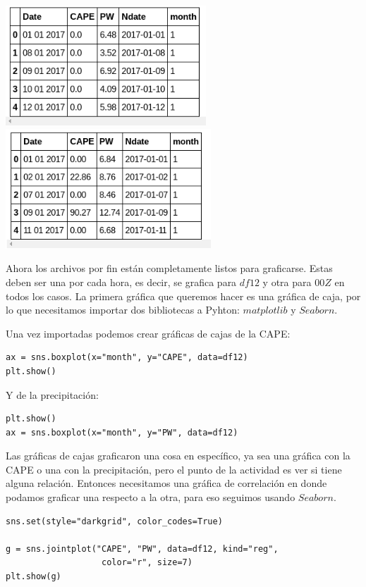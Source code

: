 \documentclass{article}
\begin{document}
    \begin{center}
    \includegraphics[height=4.5cm]{datos00.png}
    \includegraphics[height=4.5cm]{datos12.png}
    \end{center}
    
Ahora los archivos por fin están completamente listos para graficarse. Estas deben ser una por cada hora, es decir, se grafica para $df12$ y otra para $00Z$ en todos los casos. La primera gráfica que queremos hacer es una gráfica de caja, por lo que necesitamos importar dos bibliotecas a Pyhton: $matplotlib$ y $Seaborn$. 

Una vez importadas podemos crear gráficas de cajas de la CAPE:

\begin{verbatim}
ax = sns.boxplot(x="month", y="CAPE", data=df12)
plt.show()
\end{verbatim}

Y de la precipitación:

\begin{verbatim}
plt.show()
ax = sns.boxplot(x="month", y="PW", data=df12)
\end{verbatim}

Las gráficas de cajas graficaron una cosa en específico, ya sea una gráfica con la CAPE o una con la precipitación, pero el punto de la actividad es ver si tiene alguna relación. Entonces necesitamos una gráfica de correlación en donde podamos graficar una respecto a la otra, para eso seguimos usando $Seaborn$. 

\begin{verbatim}
sns.set(style="darkgrid", color_codes=True)

g = sns.jointplot("CAPE", "PW", data=df12, kind="reg",
                   color="r", size=7)
plt.show(g)
\end{verbatim}
\end{document}

